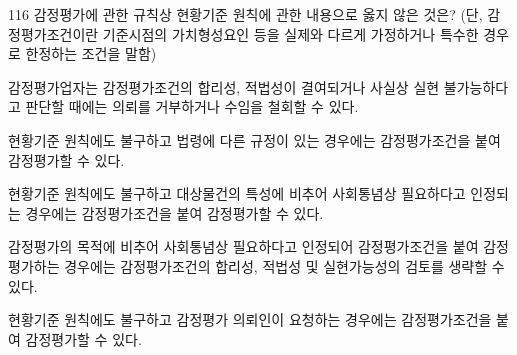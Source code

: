 \begin{question}{116}
감정평가에 관한 규칙상 현황기준 원칙에 관한 내용으로 옳지 않은 것은? (단, 감정평가조건이란 기준시점의 가치형성요인 등을 실제와 다르게 가정하거나 특수한 경우로 한정하는 조건을 말함)
\begin{choices}
  \item 감정평가업자는 감정평가조건의 합리성, 적법성이 결여되거나 사실상 실현 불가능하다고 판단할 때에는 의뢰를 거부하거나 수임을 철회할 수 있다.
  \item 현황기준 원칙에도 불구하고 법령에 다른 규정이 있는 경우에는 감정평가조건을 붙여 감정평가할 수 있다.
  \item 현황기준 원칙에도 불구하고 대상물건의 특성에 비추어 사회통념상 필요하다고 인정되는 경우에는 감정평가조건을 붙여 감정평가할 수 있다.
  \item 감정평가의 목적에 비추어 사회통념상 필요하다고 인정되어 감정평가조건을 붙여 감정평가하는 경우에는 감정평가조건의 합리성, 적법성 및 실현가능성의 검토를 생략할 수 있다.
  \item 현황기준 원칙에도 불구하고 감정평가 의뢰인이 요청하는 경우에는 감정평가조건을 붙여 감정평가할 수 있다.
\end{choices}
\end{question}
